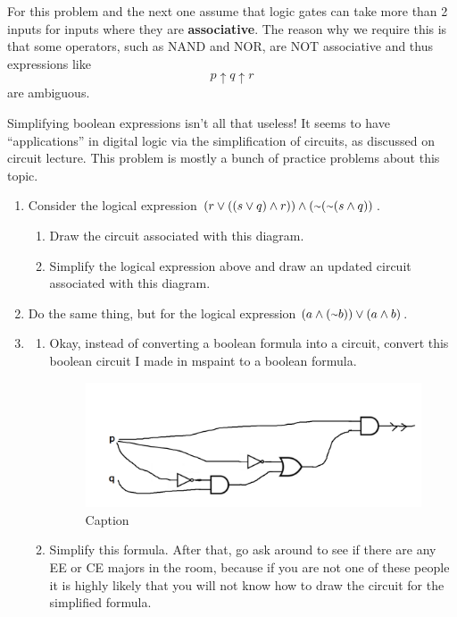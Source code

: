 For this problem and the next one assume that logic gates can take more than 2 inputs for inputs where they are \textbf{associative}. The reason why we require this is that some operators, such as NAND and NOR, are NOT associative and thus expressions like 
\[p \uparrow q \uparrow r\] are ambiguous.

Simplifying boolean expressions isn't all that useless! It seems to have ``applications'' in digital logic via the simplification of circuits, as discussed on circuit lecture. This problem is mostly a bunch of practice problems about this topic.

\begin{enumerate}
    \item Consider the logical expression $(r \lor ((s \lor q) \land r) ) \land (\shortsim (\shortsim (s \land q) )$.
    \begin{enumerate}
        \item Draw the circuit associated with this diagram.
        \item Simplify the logical expression above and draw an updated circuit associated with this diagram.
    \end{enumerate}
    \item Do the same thing, but for the logical expression $(a \land (\shortsim b)) \lor (a \land b)$.
    \pagebreak
    \item 
    \begin{enumerate}
    \item Okay, instead of converting a boolean formula into a circuit, convert this boolean circuit I made in mspaint to a boolean formula.
    
    \begin{figure}[ht]
        \centering
        \includegraphics[width=\textwidth]{Ch2/002.png}
        \caption{Caption}
        \label{fig:my_label}
    \end{figure}
    
    \item Simplify this formula. After that, go ask around to see if there are any EE or CE majors in the room, because if you are not one of these people it is highly likely that you will not know how to draw the circuit for the simplified formula.
    \end{enumerate}
\end{enumerate}